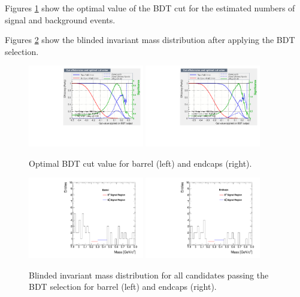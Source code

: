 Figures \ref{fig:massOptimalCut} show the optimal value of the BDT cut for the estimated numbers of signal and background
events.

Figures \ref{fig:massPlotBlinded} show the blinded invariant mass distribution after applying the BDT selection.

\begin{figure}
  \centering
  \includegraphics[width=0.45\textwidth]{Figures/mvaeffs_BDT_barrel.pdf}
  \includegraphics[width=0.45\textwidth]{Figures/mvaeffs_BDT_endcaps.pdf}
  \caption{Optimal BDT cut value for barrel (left) and endcaps (right).}
  \label{fig:massOptimalCut}
\end{figure}

\begin{figure}
  \centering
  \includegraphics[width=0.45\textwidth]{Figures/BarrelMassPlot.pdf}
  \includegraphics[width=0.45\textwidth]{Figures/EndcapsMassPlot.pdf}
  \caption{Blinded invariant mass distribution for all candidates passing the BDT selection for barrel (left) and endcaps (right).}
  \label{fig:massPlotBlinded}
\end{figure}

